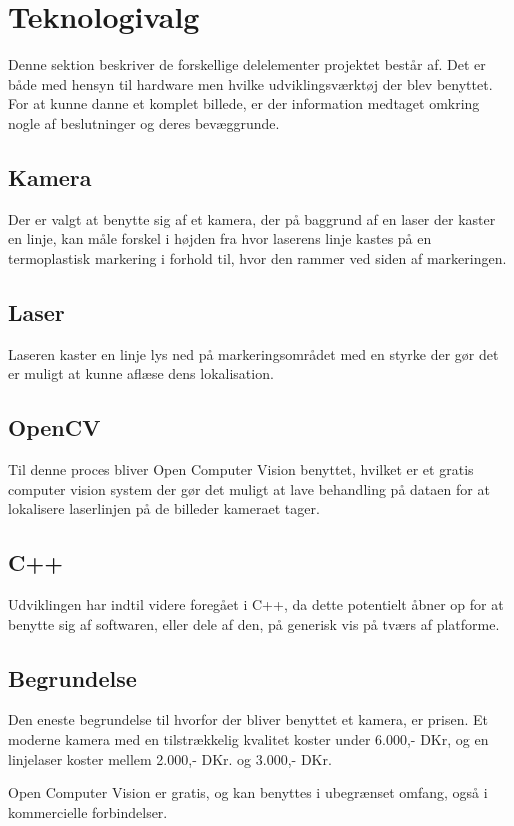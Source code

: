 \section{Teknologivalg}

Denne sektion beskriver de forskellige delelementer projektet består af. Det er både med hensyn til hardware men hvilke udviklingsværktøj der blev benyttet. For at kunne danne et komplet billede, er der information medtaget omkring nogle af beslutninger og deres bevæggrunde. 

\subsection{Kamera}
Der er valgt at benytte sig af et kamera, der på baggrund af en laser der kaster en linje, kan måle forskel i højden fra hvor laserens linje kastes på en termoplastisk markering i forhold til, hvor den rammer ved siden af markeringen.

\subsection{Laser}
Laseren kaster en linje lys ned på markeringsområdet med en styrke der gør det er muligt at kunne aflæse dens lokalisation.

\subsection{OpenCV}
Til denne proces bliver Open Computer Vision benyttet, hvilket er et gratis computer vision system der gør det muligt at lave behandling på dataen for at lokalisere laserlinjen på de billeder kameraet tager.

\subsection{C++}
Udviklingen har indtil videre foregået i C++, da dette potentielt åbner op for at benytte sig af softwaren, eller dele af den, på generisk vis på tværs af platforme.

\subsection{Begrundelse}
Den eneste begrundelse til hvorfor der bliver benyttet et kamera, er prisen. Et moderne kamera med en tilstrækkelig kvalitet koster under 6.000,- DKr, og en linjelaser koster mellem 2.000,- DKr. og 3.000,- DKr.

Open Computer Vision er gratis, og kan benyttes i ubegrænset omfang, også i kommercielle forbindelser.

